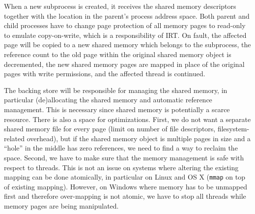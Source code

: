 When a new subprocess is created, it receives the shared memory
descriptors together with the location in the parent's process address
space. Both parent and child processes have to change page protection of
all memory pages to read-only to emulate copy-on-write, which is a
responsibility of IRT. On fault, the affected page will be copied to a
new shared memory which belongs to the subprocess, the reference count
to the old page within the original shared memory object is decremented,
the new shared memory pages are mapped in place of the original pages
with write permissions, and the affected thread is continued.

The backing store will be responsible for managing the shared memory,
in particular (de)allocating the shared memory and automatic reference
management. This is necessary since shared memory is potentially a
scarce resource. There is also a space for optimizations. First, we do
not want a separate shared memory file for every page (\eg limit on
number of file descriptors, filesystem-related overhead), but if the
shared memory object is multiple pages in size and a ``hole'' in the
middle has zero references, we need to find a way to reclaim the space.
Second, we have to make sure that the memory management is safe with
respect to threads. This is not an issue on systems where altering the
existing mapping can be done atomically, in particular on Linux and OS X
(\ie \lstinline`mmap` on top of existing mapping).  However, on
Windows where memory has to be unmapped first and therefore over-mapping
is not atomic, we have to stop all threads while memory pages are being
manipulated.


